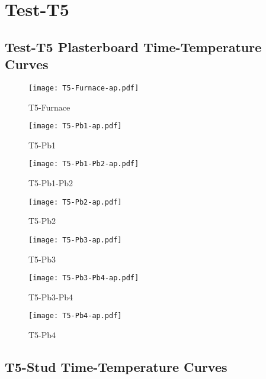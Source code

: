 \pagebreak

\section*{Test-T5}
\subsection*{Test-T5 Plasterboard Time-Temperature Curves}

\begin{figure}[htbp]
\centering
	\texttt{[image: T5-Furnace-ap.pdf]}
	\caption*{T5-Furnace}
\end{figure}
\begin{figure}[htbp]
	\centering
		\texttt{[image: T5-Pb1-ap.pdf]}
		\caption*{T5-Pb1}
\end{figure}
\begin{figure}[htbp]
	\centering
		\texttt{[image: T5-Pb1-Pb2-ap.pdf]}
		\caption*{T5-Pb1-Pb2}
\end{figure}
\begin{figure}[htbp]
	\centering
		\texttt{[image: T5-Pb2-ap.pdf]}
		\caption*{T5-Pb2}
\end{figure}
\begin{figure}[htbp]
	\centering
		\texttt{[image: T5-Pb3-ap.pdf]}
		\caption*{T5-Pb3}
\end{figure}
\begin{figure}[htbp]
	\centering
			\texttt{[image: T5-Pb3-Pb4-ap.pdf]}
			\caption*{T5-Pb3-Pb4}
\end{figure}
\begin{figure}[htbp]
	\centering
			\texttt{[image: T5-Pb4-ap.pdf]}
			\caption*{T5-Pb4}
\end{figure}

\pagebreak

\subsection*{T5-Stud Time-Temperature Curves}

